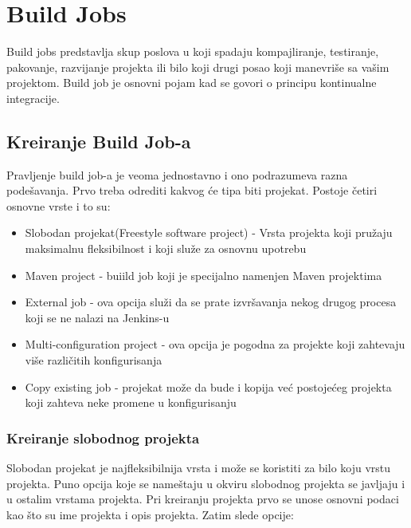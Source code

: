 \section{Build Jobs}

Build jobs predstavlja skup poslova u koji spadaju kompajliranje, testiranje, pakovanje, razvijanje projekta ili bilo koji drugi posao koji manevriše sa vašim projektom. Build job je osnovni pojam kad se govori o principu kontinualne integracije.

\subsection{Kreiranje Build Job-a}

Pravljenje build job-a je veoma jednostavno i ono podrazumeva razna podešavanja. Prvo treba odrediti kakvog će tipa biti projekat. Postoje četiri osnovne vrste i to su:
\begin{itemize}  
\item Slobodan projekat(Freestyle software project) - Vrsta projekta koji pružaju maksimalnu fleksibilnost i koji služe za osnovnu upotrebu
\item Maven project - buiild job koji je specijalno namenjen Maven projektima 
\item External job - ova opcija služi da se prate izvršavanja nekog drugog procesa koji se ne nalazi na Jenkins-u
\item Multi-configuration project - ova opcija je pogodna za projekte koji zahtevaju više različitih konfigurisanja
\item Copy existing job - projekat može da bude i kopija već postojećeg projekta koji zahteva neke promene u konfigurisanju
\end{itemize}  

\subsubsection{Kreiranje slobodnog projekta}

Slobodan projekat je najfleksibilnija vrsta i može se koristiti za bilo koju vrstu projekta. Puno opcija koje se nameštaju u okviru slobodnog projekta se javljaju i u ostalim vrstama projekta. Pri kreiranju projekta prvo se unose osnovni podaci kao što su ime projekta i opis projekta. Zatim slede opcije:

